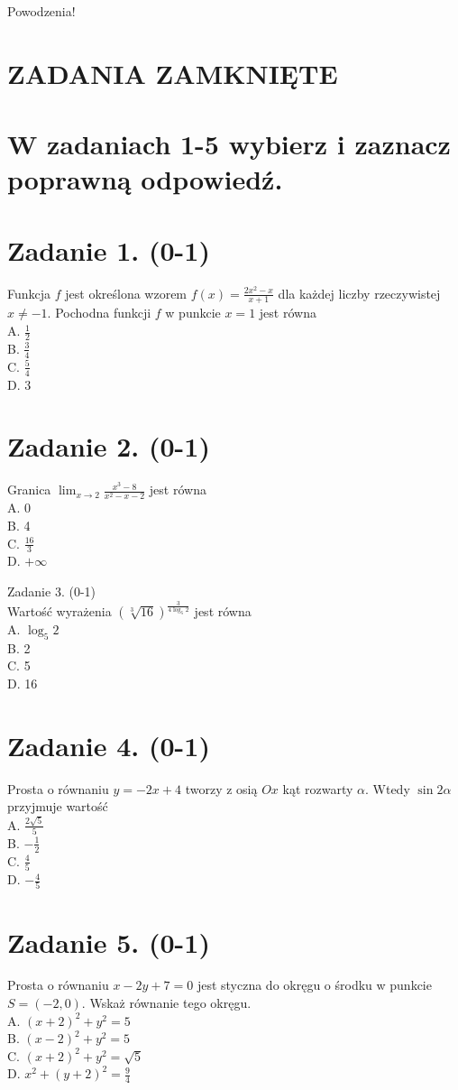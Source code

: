 \documentclass[10pt]{article}
\begin{document}
Powodzenia!

\section*{ZADANIA ZAMKNIĘTE}
\section*{W zadaniach 1-5 wybierz i zaznacz poprawną odpowiedź.}
\section*{Zadanie 1. (0-1)}
Funkcja \(f\) jest określona wzorem \(f(x)=\frac{2 x^{2}-x}{x+1}\) dla każdej liczby rzeczywistej \(x \neq-1\). Pochodna funkcji \(f\) w punkcie \(x=1\) jest równa\\
A. \(\frac{1}{2}\)\\
B. \(\frac{3}{4}\)\\
C. \(\frac{5}{4}\)\\
D. 3

\section*{Zadanie 2. (0-1)}
Granica \(\lim _{x \rightarrow 2} \frac{x^{3}-8}{x^{2}-x-2}\) jest równa\\
A. 0\\
B. 4\\
C. \(\frac{16}{3}\)\\
D. \(+\infty\)

Zadanie 3. (0-1)\\
Wartość wyrażenia \((\sqrt[3]{16})^{\frac{3}{4 \log _{5} 2}}\) jest równa\\
A. \(\log _{5} 2\)\\
B. 2\\
C. 5\\
D. 16

\section*{Zadanie 4. (0-1)}
Prosta o równaniu \(y=-2 x+4\) tworzy z osią \(O x\) kąt rozwarty \(\alpha\). Wtedy \(\sin 2 \alpha\) przyjmuje wartość\\
A. \(\frac{2 \sqrt{5}}{5}\)\\
B. \(-\frac{1}{2}\)\\
C. \(\frac{4}{5}\)\\
D. \(-\frac{4}{5}\)

\section*{Zadanie 5. (0-1)}
Prosta o równaniu \(x-2 y+7=0\) jest styczna do okręgu o środku w punkcie \(S=(-2,0)\). Wskaż równanie tego okręgu.\\
A. \((x+2)^{2}+y^{2}=5\)\\
B. \((x-2)^{2}+y^{2}=5\)\\
C. \((x+2)^{2}+y^{2}=\sqrt{5}\)\\
D. \(x^{2}+(y+2)^{2}=\frac{9}{4}\)
\end{document}
